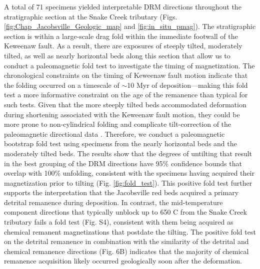 A total of 71 specimens yielded interpretable DRM directions throughout the stratigraphic section at the Snake Creek tributary (Figs. \ref{fig:Chap_Jacobsville_Geologic_map} and \ref{fig:in_situ_pmag}). The stratigraphic section is within a large-scale drag fold within the immediate footwall of the Keweenaw fault. As a result, there are exposures of steeply tilted, moderately tilted, as well as nearly horizontal beds along this section that allow us to conduct a paleomagnetic fold test to investigate the timing of magnetization. The chronological constraints on the timing of Keweenaw fault motion indicate that the folding occurred on a timescale of $\sim$10 Myr of deposition---making this fold test a more informative constraint on the age of the remanence than typical for such tests. Given that the more steeply tilted beds accommodated deformation during shortening associated with the Keweenaw fault motion, they could be more prone to non-cylindrical folding and complicate tilt-correction of the paleomagnetic directional data \cite[e.g.][]{Pueyo2003a, Nabavi2021a}. Therefore, we conduct a paleomagnetic bootstrap fold test \citep{Tauxe1994a} using specimens from the nearly horizontal beds and the moderately tilted beds. The results show that the degrees of untilting that result in the best grouping of the DRM directions have 95\% confidence bounds that overlap with 100\% unfolding, consistent with the specimens having acquired their magnetization prior to tilting (Fig. \ref{fig:fold_test}). This positive fold test further supports the interpretation that the Jacobsville red beds acquired a primary detrital remanence during deposition. In contrast, the mid-temperature component directions that typically unblock up to 650 \textdegree C from the Snake Creek tributary fails a fold test (Fig. S4), consistent with them being acquired as chemical remanent magnetizations that postdate the tilting. The positive fold test on the detrital remanence in combination with the similarity of the detrital and chemical remanence directions (Fig. 6B) indicates that the majority of chemical remanence acquisition likely occurred geologically soon after the deformation.

